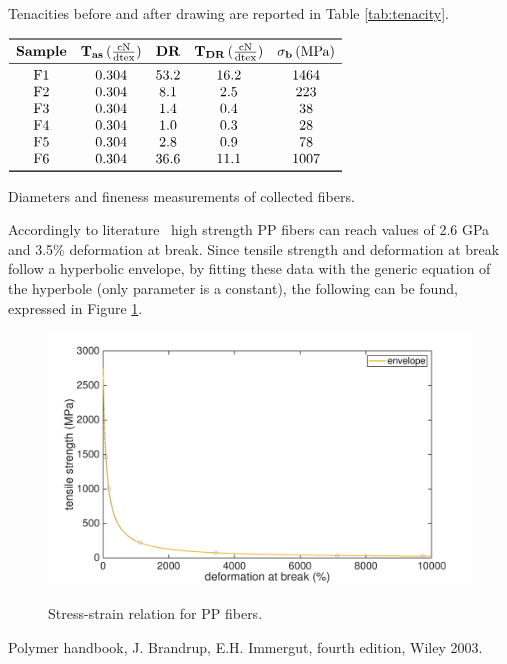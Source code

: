 \documentclass[a4paper, 11pt]{article}
\begin{document}
Tenacities before and after drawing are reported in Table \ref{tab:tenacity}.
\begin{table}[htp]
\centering
$
\begin{array}{ccccc}
\toprule
\textbf{Sample} & \mathbf{T_{as}} \, (\frac{\text{cN}}{\text{dtex}}) & \textbf{DR} & \mathbf{T_{DR}}\, (\frac{\text{cN}}{\text{dtex}}) & \mathbf{\sigma_b} \, (\text{MPa})\\
\midrule
\text{F1} & 0.304 & 53.2 & 16.2 & 1464\\
\text{F2} & 0.304 & 8.1 & 2.5 & 223\\ 
\text{F3} & 0.304 & 1.4 & 0.4 & 38\\
\text{F4} & 0.304 & 1.0 & 0.3 & 28\\
\text{F5} & 0.304 & 2.8 & 0.9 & 78\\
\text{F6} & 0.304 & 36.6 & 11.1 & 1007\\
\bottomrule
\end{array}
$
\caption{Diameters and fineness measurements of collected fibers.}
\label{tab:titer}
\end{table}

Accordingly to literature~\cite{encyclopedia} high strength PP fibers can reach values of 2.6 GPa and 3.5\% deformation at break. Since tensile strength and deformation at break follow a hyperbolic envelope, by fitting these data with the generic equation of the hyperbole (only parameter is a constant), the following can be found, expressed in Figure \ref{fig:hyperbole}.
\begin{figure}[htp]
	\centering
	\includegraphics[scale=0.15]
	{hyperbole.png}
	\label{fig:hyperbole}
	\caption{Stress-strain relation for PP fibers.}
\end{figure}


\begin{thebibliography}{1}

 Polymer handbook, J. Brandrup, E.H. Immergut, fourth edition, Wiley 2003.
\end{thebibliography}
\end{document}
